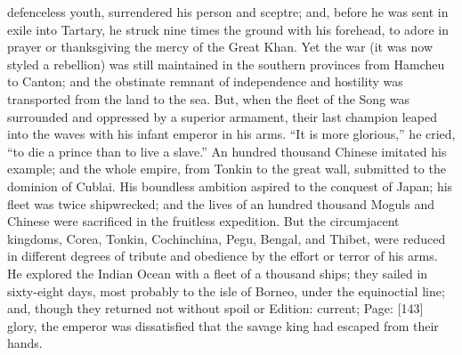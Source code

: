 defenceless youth, surrendered his person and sceptre; and, before he was sent in exile into Tartary, he struck nine times the ground with his forehead, to adore in prayer or thanksgiving the mercy of the Great Khan. Yet the war (it was now styled a rebellion) was still maintained in the southern provinces from Hamcheu to Canton; and the obstinate remnant of independence and hostility was transported from the land to the sea. But, when the fleet of the Song was surrounded and oppressed by a superior armament, their last champion leaped into the waves with his infant emperor in his arms. \texthebrew{“}It is more glorious,\texthebrew{}” he cried, \texthebrew{“}to die a prince than to live a slave.\texthebrew{}” An hundred thousand Chinese imitated his example; and the whole empire, from Tonkin to the great wall, submitted to the dominion of Cublai. His boundless ambition aspired to the conquest of Japan; his fleet was twice shipwrecked; and the lives of an hundred thousand Moguls and Chinese were sacrificed in the fruitless expedition. But the circumjacent kingdoms, Corea, Tonkin, Cochinchina, Pegu, Bengal, and Thibet, were reduced in different degrees of tribute and obedience by the effort or terror of his arms. He explored the Indian Ocean with a fleet of a thousand ships; they sailed in sixty-eight days, most probably to the isle of Borneo, under the equinoctial line; and, though they returned not without spoil or Edition: current; Page: [143] glory, the emperor was dissatisfied that the savage king had escaped from their hands.

